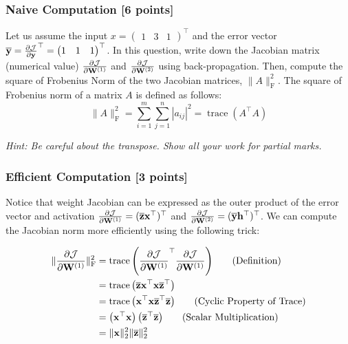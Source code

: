 \documentclass[11pt]{article}
\begin{document}
\subsubsection{Naive Computation {\color{blue}[6 points]}}
Let us assume the input $x=\begin{pmatrix} 1 & 3 & 1 \end{pmatrix}^{\top}$ and the error vector $\overline{\mathbf{y}}= \frac{\partial \mathcal{J}}{\partial \mathbf{y}}^{\top} = {\begin{pmatrix} 1 & 1 & 1 \end{pmatrix}}^{\top}$. In this question, write down the Jacobian matrix (numerical value) $\frac{\partial \mathcal{J}}{\partial \mathbf{W}^{(1)}}$ and $\frac{\partial \mathcal{J}}{\partial \mathbf{W}^{(2)}}$ using back-propagation. Then, compute the square of Frobenius Norm of the two Jacobian matrices, $\|A\|^2_{\mathrm{F}}$. The square of Frobenius norm of a matrix $A$ is defined as follows:
$$
\|A\|^2_{\mathrm{F}}={\sum_{i=1}^{m} \sum_{j=1}^{n}\left|a_{i j}\right|^{2}}={\operatorname{trace}\left(A^{\top} A\right)}
$$

\noindent \emph{Hint: Be careful about the transpose. Show all your work for partial marks.}


\subsubsection{Efficient Computation {\color{blue}[3 points]}}
Notice that weight Jacobian can be expressed as the outer product of the error vector and activation $\frac{\partial \mathcal{J}}{\partial \mathbf{W}^{(1)}} = (\overline{\mathbf{z}} {\bf x}^{\top})^{\top}$ and $\frac{\partial \mathcal{J}}{\partial \mathbf{W}^{(2)}} = (\overline{\mathbf{y}} \mathbf{h}^{\top})^{\top}$. We can compute the Jacobian norm more efficiently using the following trick:

\begin{align*}
    \|\frac{\partial \mathcal{J}}{\partial \mathbf{W}^{(1)}}\|^2_{\mathrm{F}} &={\operatorname{trace}\left({\frac{\partial \mathcal{J}}{\partial \mathbf{W}^{(1)}}}^{\top} \frac{\partial \mathcal{J}}{\partial \mathbf{W}^{(1)}} \right)} \qquad (\text{Definition}) \\
    &= {\operatorname{trace}\left(\overline{\mathbf{z}} {\bf x}^{\top} {\bf x} {\overline{\mathbf{z}}}^{\top} \right)} \\
    &= {\operatorname{trace}\left({{\bf x}}^{\top} {\bf x} {\overline{\mathbf{z}}}^{\top} \overline{\mathbf{z}} \right)} \qquad (\text{Cyclic Property of Trace}) \\
    &= {\left({{\bf x}}^{\top} {\bf x} \right) \left({\overline{\mathbf{z}}}^{\top} \overline{\mathbf{z}} \right)} \qquad (\text{Scalar Multiplication})\\
    &= \|{\bf x}\|^2_2 \|\overline{\mathbf{z}}\|^2_2
\end{align*} \\
\end{document}

